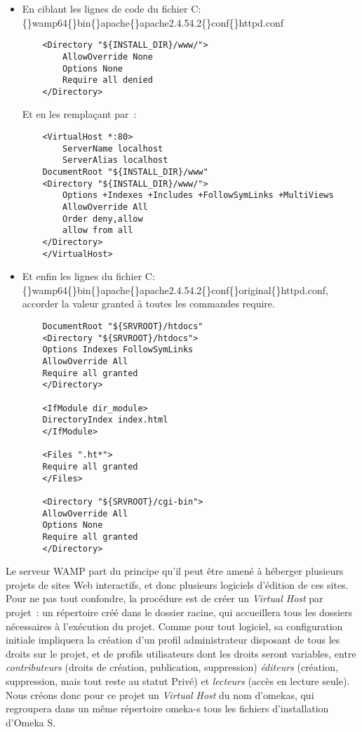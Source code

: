 \documentclass[a4paper,12pt, twoside]{book}
\begin{document}
\begin{itemize}
    \item En ciblant les lignes de code du fichier \textsf{C:\{\}wamp64\{\}bin\{\}apache\{\}apache2.4.54.2\{\}conf\{\}httpd.conf}\\

	\begin{verbatim}
    <Directory "${INSTALL_DIR}/www/">
        AllowOverride None
        Options None
        Require all denied
    </Directory>
	\end{verbatim}

    Et en les remplaçant par~:
    
	\begin{verbatim}
    <VirtualHost *:80>
        ServerName localhost
        ServerAlias localhost
    DocumentRoot "${INSTALL_DIR}/www"
    <Directory "${INSTALL_DIR}/www/">
        Options +Indexes +Includes +FollowSymLinks +MultiViews
        AllowOverride All
        Order deny,allow
        allow from all
    </Directory>
    </VirtualHost>
	\end{verbatim}

\medskip

    \item Et enfin les lignes du fichier \textsf{C:\{\}wamp64\{\}bin\{\}apache\{\}apache2.4.54.2\{\}conf\{\}original\{\}httpd.conf}, accorder la valeur \textsf{granted} à toutes les commandes \textsf{require}.
    
\begin{verbatim}
	DocumentRoot "${SRVROOT}/htdocs"
	<Directory "${SRVROOT}/htdocs">
	Options Indexes FollowSymLinks
	AllowOverride All
	Require all granted
	</Directory>

	<IfModule dir_module>
	DirectoryIndex index.html
	</IfModule>
	
	<Files ".ht*">
	Require all granted
	</Files>

	<Directory "${SRVROOT}/cgi-bin">
	AllowOverride All
	Options None
	Require all granted
	</Directory>
\end{verbatim}
\end{itemize}

Le serveur WAMP part du principe qu’il peut être amené à héberger plusieurs projets de sites Web interactifs, et donc plusieurs logiciels d’édition de ces sites. Pour ne pas tout confondre, la procédure est de créer un \textit{Virtual Host} par projet~: un  répertoire créé dans le dossier racine, qui accueillera tous les dossiers nécessaires à l’exécution du projet. Comme pour tout logiciel, sa configuration initiale impliquera la création d’un profil administrateur disposant de tous les droits sur le projet, et de profils utilisateurs dont les droits seront variables, entre \textit{contributeurs} (droits de création, publication, suppression) \textit{éditeurs} (création, suppression, mais tout reste au statut Privé) et \textit{lecteurs} (accès en lecture seule). Nous créons donc pour ce projet un \textit{Virtual Host} du nom d’\textsf{omekas}, qui regroupera dans un même répertoire \textsf{omeka-s} tous les fichiers d’installation d’Omeka S.
\end{document}
